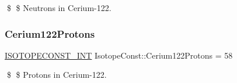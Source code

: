 \$ \$ Neutrons in Cerium-\/122. \mbox{\label{group___isotope_const-_cerium-_ce122_gab5ed3a738d46e86bee4f37a1bcb97f0d}} 
\subsubsection{\texorpdfstring{Cerium122\+Protons}{Cerium122Protons}}
{\footnotesize\ttfamily \mbox{\hyperlink{group___isotope_const-_macros_ga5f18360b3e99483a35c32d789e62621c}{I\+S\+O\+T\+O\+P\+E\+C\+O\+N\+S\+T\+\_\+\+I\+NT}} Isotope\+Const\+::\+Cerium122\+Protons = 58}

\$ \$ Protons in Cerium-\/122. 